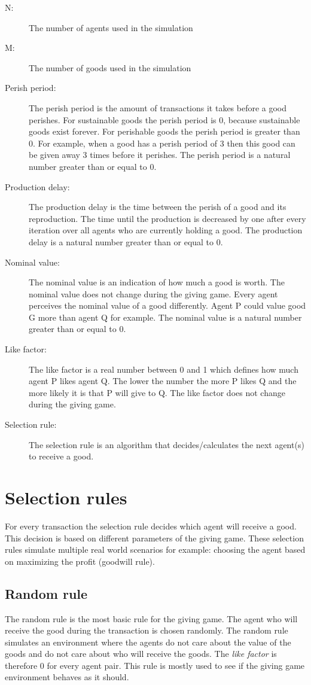 \documentclass[twoside,openright]{uva-bachelor-thesis}
\begin{document}
\begin{description}
\item[N:] The number of agents used in the simulation
\item[M:] The number of goods used in the simulation
\item[Perish period:] The perish period is the amount of transactions it takes before a good perishes. For sustainable goods the perish period is 0, because sustainable goods exist forever. For perishable goods the perish period is greater than 0. For example, when a good has a perish period of 3 then this good can be given away 3 times before it perishes. The perish period is a natural number greater than or equal to 0.
\item[Production delay:] The production delay is the time between the perish of a good and its reproduction. The time until the production is decreased by one after every iteration over all agents who are currently holding a good. The production delay is a natural number greater than or equal to 0.
\item[Nominal value:] The nominal value is an indication of how much a good is worth. The nominal value does not change during the giving game. Every agent perceives the nominal value of a good differently. Agent P could value good G more than agent Q for example. The nominal value is a natural number greater than or equal to 0.
\item[Like factor:] The like factor is a real number between 0 and 1 which defines how much agent P likes agent Q. The lower the number the more P likes Q and the more likely it is that P will give to Q. The like factor does not change during the giving game. 
\item[Selection rule:] The selection rule is an algorithm that decides/calculates the next agent(s) to receive a good.

\end{description}

\section{Selection rules}
For every transaction the selection rule decides which agent will receive a good. This decision is based on different parameters of the giving game. These selection rules simulate multiple real world scenarios for example: choosing the agent based on maximizing the profit (goodwill rule).

\subsection{Random rule}
The random rule is the most basic rule for the giving game. The agent who will receive the good during the transaction is chosen randomly. The random rule simulates an environment where the agents do not care about the value of the goods and do not care about who will receive the goods. The \textit{like factor} is therefore 0 for every agent pair. This rule is mostly used to see if the giving game environment behaves as it should.
\end{document}
